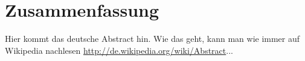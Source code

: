 \chapter*{Zusammenfassung}
\label{cha:zusammenfassung}

Hier kommt das deutsche Abstract hin. Wie das geht, kann man wie immer auf Wikipedia nachlesen \url{http://de.wikipedia.org/wiki/Abstract}...